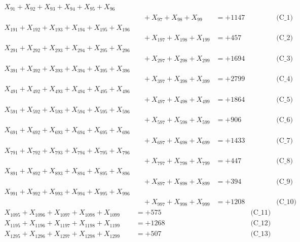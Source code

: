 \documentclass[a4paper,10pt]{article}
\begin{document}
\allowdisplaybreaks
{\small
\begin{align}
X_{91} + X_{92} + X_{93} + X_{94} + X_{95} + X_{96} \\[0.1ex]
&\quad  + X_{97} + X_{98} + X_{99} &= +1147 && \text{(C\_1)} \\
X_{191} + X_{192} + X_{193} + X_{194} + X_{195} + X_{196} \\[0.1ex]
&\quad  + X_{197} + X_{198} + X_{199} &= +457 && \text{(C\_2)} \\
X_{291} + X_{292} + X_{293} + X_{294} + X_{295} + X_{296} \\[0.1ex]
&\quad  + X_{297} + X_{298} + X_{299} &= +1694 && \text{(C\_3)} \\
X_{391} + X_{392} + X_{393} + X_{394} + X_{395} + X_{396} \\[0.1ex]
&\quad  + X_{397} + X_{398} + X_{399} &= +2799 && \text{(C\_4)} \\
X_{491} + X_{492} + X_{493} + X_{494} + X_{495} + X_{496} \\[0.1ex]
&\quad  + X_{497} + X_{498} + X_{499} &= +1864 && \text{(C\_5)} \\
\allowbreak
X_{591} + X_{592} + X_{593} + X_{594} + X_{595} + X_{596} \\[0.1ex]
&\quad  + X_{597} + X_{598} + X_{599} &= +906 && \text{(C\_6)} \\
X_{691} + X_{692} + X_{693} + X_{694} + X_{695} + X_{696} \\[0.1ex]
&\quad  + X_{697} + X_{698} + X_{699} &= +1433 && \text{(C\_7)} \\
X_{791} + X_{792} + X_{793} + X_{794} + X_{795} + X_{796} \\[0.1ex]
&\quad  + X_{797} + X_{798} + X_{799} &= +447 && \text{(C\_8)} \\
X_{891} + X_{892} + X_{893} + X_{894} + X_{895} + X_{896} \\[0.1ex]
&\quad  + X_{897} + X_{898} + X_{899} &= +394 && \text{(C\_9)} \\
X_{991} + X_{992} + X_{993} + X_{994} + X_{995} + X_{996} \\[0.1ex]
&\quad  + X_{997} + X_{998} + X_{999} &= +1208 && \text{(C\_10)} \\
\allowbreak
X_{1095} + X_{1096} + X_{1097} + X_{1098} + X_{1099} &= +575 && \text{(C\_11)} \\
X_{1195} + X_{1196} + X_{1197} + X_{1198} + X_{1199} &= +1268 && \text{(C\_12)} \\
X_{1295} + X_{1296} + X_{1297} + X_{1298} + X_{1299} &= +507 && \text{(C\_13)} \\

\end{align}}
\end{document}
